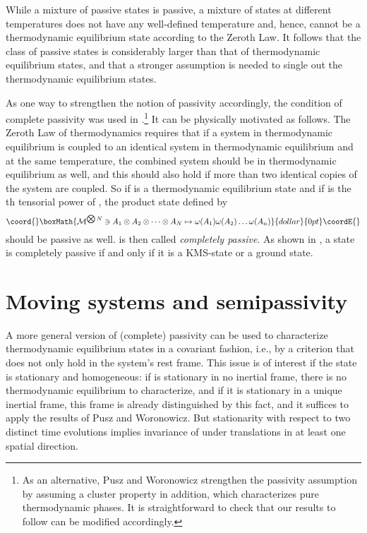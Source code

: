 \documentclass[a4paper,11pt]{article}
\def\dt{\cal}
\def\dM{{\dt M}}
\def\go{\omega}
\begin{document}
While a mixture of passive states is passive,
a mixture of states at different temperatures
does not have any well-defined temperature and, hence, cannot be a
thermodynamic equilibrium state according to the Zeroth Law. It follows
that the class of passive states is considerably larger than that of
thermodynamic equilibrium states, and that a stronger assumption is
needed to single out the thermodynamic equilibrium states.

As one way to strengthen the notion of passivity accordingly,
the condition of complete passivity was used in \cite{PW78}.\footnote{
As an alternative, Pusz and Woronowicz strengthen the passivity
assumption by assuming a cluster property in addition, which
characterizes pure thermodynamic phases. It is
straightforward to check that our results to follow can be
modified accordingly.} It can be
physically motivated as follows. The Zeroth Law of thermodynamics requires
that if a system in thermodynamic equilibrium is coupled to
an identical system in thermodynamic equilibrium and at the
same temperature, the combined system should be in thermodynamic
equilibrium as well, and this should also hold if more than two
identical copies of the system are coupled. So if \myHighlight{$\go$}\coordHE{} is a
thermodynamic equilibrium state and if
\myHighlight{$\dM^{\bigotimes N}$}\coordHE{} is the \coordHE{}th tensorial power of \myHighlight{$\dM$}\coordHE{},
the product state defined by
$$\coord{}\boxMath{\dM^{\bigotimes N}\ni A_1\otimes A_2\otimes\dots
\otimes A_N\mapsto\go(A_1)\go(A_2)\dots\go(A_n)}{dollar}{0pt}\coordE{}$$
should be passive as well. \myHighlight{$\go$}\coordHE{} is then called
{\it completely passive}. As shown
in \cite{PW78}, a state is completely passive if and only if it is
a KMS-state or a ground state.


\section{Moving systems and semipassivity}\label{covariant version}

A more general version of (complete) passivity can be used to characterize
thermodynamic equilibrium states in a covariant fashion, i.e., by
a criterion that does not only hold in the system's rest frame.
This issue is of
interest if the state \myHighlight{$\go$}\coordHE{} is stationary and homogeneous: if \myHighlight{$\go$}\coordHE{} is
stationary in no inertial frame, there is no thermodynamic equilibrium
to characterize, and if it is stationary in a unique inertial frame,
this frame is already distinguished by this fact, and it suffices to
apply the results of Pusz and Woronowicz. But
stationarity with respect to two distinct time evolutions implies
invariance of \myHighlight{$\go$}\coordHE{} under translations in at least one spatial direction.
\end{document}

